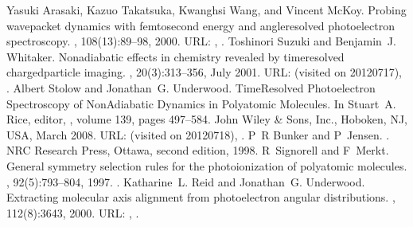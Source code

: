 \documentclass[letterpaper,table,10pt,english]{jupyterBook}
\begin{document}
\begin{sphinxthebibliography}{10}
\sphinxAtStartPar
Yasuki Arasaki, Kazuo Takatsuka, Kwanghsi Wang, and Vincent McKoy. Probing wavepacket dynamics with femtosecond energy\sphinxhyphen{} and angle\sphinxhyphen{}resolved photoelectron spectroscopy. , 108(1\sphinxhyphen{}3):89–98, 2000. URL: , .
\sphinxAtStartPar
Toshinori Suzuki and Benjamin J. Whitaker. Non\sphinxhyphen{}adiabatic effects in chemistry revealed by time\sphinxhyphen{}resolved charged\sphinxhyphen{}particle imaging. , 20(3):313–356, July 2001. URL:  (visited on 2012\sphinxhyphen{}07\sphinxhyphen{}17), .
\sphinxAtStartPar
Albert Stolow and Jonathan G. Underwood. Time\sphinxhyphen{}Resolved Photoelectron Spectroscopy of Non\sphinxhyphen{}Adiabatic Dynamics in Polyatomic Molecules. In Stuart A. Rice, editor, , volume 139, pages 497–584. John Wiley \& Sons, Inc., Hoboken, NJ, USA, March 2008. URL:  (visited on 2012\sphinxhyphen{}07\sphinxhyphen{}18), .
\sphinxAtStartPar
P R Bunker and P Jensen. . NRC Research Press, Ottawa, second edition, 1998.
\sphinxAtStartPar
R Signorell and F Merkt. General symmetry selection rules for the photoionization of polyatomic molecules. , 92(5):793–804, 1997. .
\sphinxAtStartPar
Katharine L. Reid and Jonathan G. Underwood. Extracting molecular axis alignment from photoelectron angular distributions. , 112(8):3643, 2000. URL: , .

\end{sphinxthebibliography}
\end{document}
